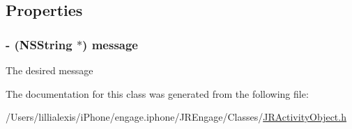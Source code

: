 \subsection{Properties}
\hypertarget{interface_j_r_sms_object_a6d74c049eba0e6ecfae0e25cffd77d6e}{
\subsubsection[{message}]{\setlength{\rightskip}{0pt plus 5cm}-\/ (NSString $\ast$) message}}
\label{interface_j_r_sms_object_a6d74c049eba0e6ecfae0e25cffd77d6e}
The desired message 

The documentation for this class was generated from the following file:\begin{DoxyCompactItemize}
\item 
/Users/lillialexis/iPhone/engage.iphone/JREngage/Classes/\hyperlink{_j_r_activity_object_8h}{JRActivityObject.h}\end{DoxyCompactItemize}
